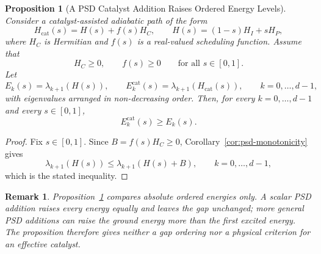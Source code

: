 \documentclass[11pt, a4paper]{article}
\newtheorem{proposition}[theorem]{Proposition}
\newtheorem{remark}[theorem]{Remark}
\begin{document}
\begin{proposition}[A PSD Catalyst Addition Raises Ordered Energy Levels]
\label{prop:psd-catalysts}
Consider a catalyst-assisted adiabatic path of the form
\begin{equation}
H_{\mathrm{cat}}(s)=H(s)+f(s)H_C,
\qquad
H(s)=(1-s)H_I+sH_P,
\end{equation}
where $H_C$ is Hermitian and $f(s)$ is a real-valued scheduling function. Assume that
\begin{equation}
H_C\ge 0,
\qquad
f(s)\ge 0
\qquad
\text{for all }s\in[0,1].
\end{equation}
Let
\begin{equation}
E_k(s)=\lambda_{k+1}(H(s)),
\qquad
E_k^{\mathrm{cat}}(s)=\lambda_{k+1}(H_{\mathrm{cat}}(s)),
\qquad k=0,\ldots,d-1,
\end{equation}
with eigenvalues arranged in non-decreasing order. Then, for every $k=0,\dots,d-1$ and every $s\in[0,1]$,
\begin{equation}
E_k^{\mathrm{cat}}(s)\ge E_k(s).
\end{equation}
\end{proposition}

\begin{proof}
Fix $s\in[0,1]$. Since $B=f(s)H_C\ge0$, Corollary~\ref{cor:psd-monotonicity} gives
\begin{equation}
\lambda_{k+1}(H(s))\le\lambda_{k+1}(H(s)+B),
\qquad k=0,\ldots,d-1,
\end{equation}
which is the stated inequality.
\end{proof}

\begin{remark}
Proposition~\ref{prop:psd-catalysts} compares absolute ordered energies only. A scalar PSD addition raises every energy equally and leaves the gap unchanged; more general PSD additions can raise the ground energy more than the first excited energy. The proposition therefore gives neither a gap ordering nor a physical criterion for an effective catalyst.
\end{remark}
\end{document}
